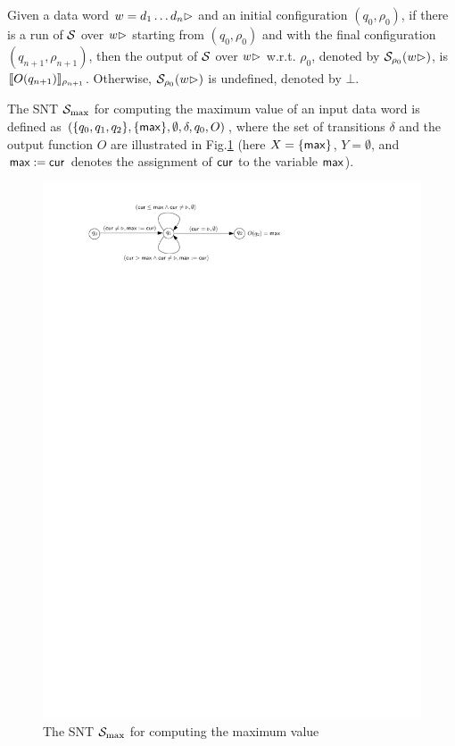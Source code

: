 Given a data word $w = d_1 \dots d_n\rhd$ and an initial configuration $(q_0, \rho_0)$, if there is a run of ${\mathcal{S} }$ over $w\rhd$ starting from $(q_0,\rho_0)$ and with the final configuration $(q_{n+1},\rho_{n+1})$, then the output of ${\mathcal{S} }$ over $w\rhd$ w.r.t. $\rho_0$, denoted by ${{\mathcal{S} }}_{\rho_0}(w\rhd)$, is $\llbracket O(q_{n+1})\rrbracket_{\rho_{n+1}}$. Otherwise, ${{\mathcal{S} }}_{\rho_0}(w\rhd)$ is undefined, denoted by $\bot$. 


\begin{example}
The SNT ${\mathcal{S} }_{\max}$ for computing the maximum value of an input data word is defined as $(\{q_0,q_1,q_2\}, \{\mathsf{max}\}, \emptyset, \delta, q_0, O)$, where the set of transitions $\delta$ and the output function $O$ are illustrated in Fig.\ref{fig-snt-exmp}
%
(here $X=\{\mathsf{max}\}$, $Y=\emptyset$, and $\mathsf{max}:=\mathsf{cur}$ denotes the assignment of $\mathsf{cur}$ to the variable $\mathsf{max}$).
\begin{figure}[htbp]
\begin{center}
\includegraphics{snt-exmp.pdf}
\caption{The SNT ${\mathcal{S} }_{\max}$ for computing the maximum value}
\label{fig-snt-exmp}
\end{center}
\end{figure}
\end{example}


